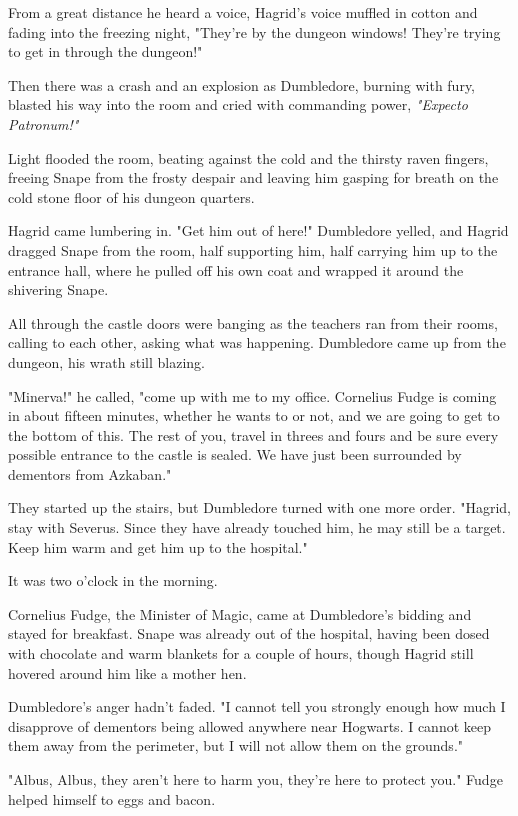 From a great distance he heard a voice, Hagrid's voice muffled in cotton and fading into the freezing night, "They're by the dungeon windows! They're trying to get in through the dungeon!"

Then there was a crash and an explosion as Dumbledore, burning with fury, blasted his way into the room and cried with commanding power, \emph{"Expecto Patronum!"}

Light flooded the room, beating against the cold and the thirsty raven fingers, freeing Snape from the frosty despair and leaving him gasping for breath on the cold stone floor of his dungeon quarters.

Hagrid came lumbering in. "Get him out of here!" Dumbledore yelled, and Hagrid dragged Snape from the room, half supporting him, half carrying him up to the entrance hall, where he pulled off his own coat and wrapped it around the shivering Snape.

All through the castle doors were banging as the teachers ran from their rooms, calling to each other, asking what was happening. Dumbledore came up from the dungeon, his wrath still blazing.

"Minerva!" he called, "come up with me to my office. Cornelius Fudge is coming in about fifteen minutes, whether he wants to or not, and we are going to get to the bottom of this. The rest of you, travel in threes and fours and be sure every possible entrance to the castle is sealed. We have just been surrounded by dementors from Azkaban."

They started up the stairs, but Dumbledore turned with one more order. "Hagrid, stay with Severus. Since they have already touched him, he may still be a target. Keep him warm and get him up to the hospital."

It was two o'clock in the morning.

Cornelius Fudge, the Minister of Magic, came at Dumbledore's bidding and stayed for breakfast. Snape was already out of the hospital, having been dosed with chocolate and warm blankets for a couple of hours, though Hagrid still hovered around him like a mother hen.

Dumbledore's anger hadn't faded. "I cannot tell you strongly enough how much I disapprove of dementors being allowed anywhere near Hogwarts. I cannot keep them away from the perimeter, but I will not allow them on the grounds."

"Albus, Albus, they aren't here to harm you, they're here to protect you." Fudge helped himself to eggs and bacon.

